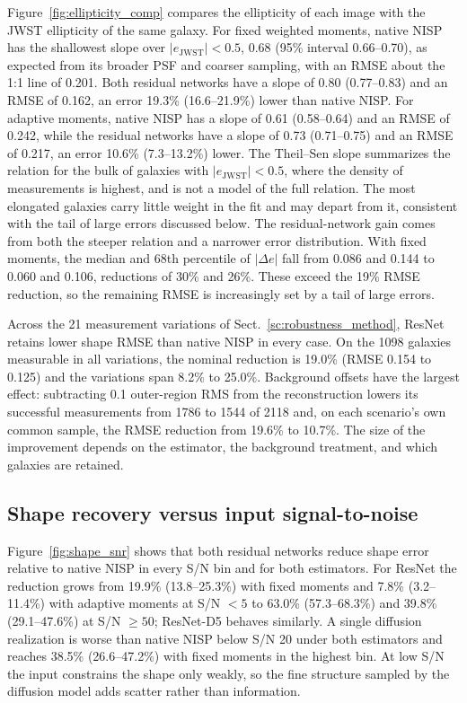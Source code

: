 \documentclass[longauth]{aa}
\begin{document}
Figure~\ref{fig:ellipticity_comp} compares the ellipticity of each image with the JWST ellipticity of the same galaxy.
For fixed weighted moments, native NISP has the shallowest slope over $|e_{\mathrm{JWST}}|<0.5$, 0.68 (95\% interval 0.66--0.70), as expected from its broader PSF and coarser sampling, with an RMSE about the 1:1 line of 0.201.
Both residual networks have a slope of 0.80 (0.77--0.83) and an RMSE of 0.162, an error 19.3\% (16.6--21.9\%) lower than native NISP.
For adaptive moments, native NISP has a slope of 0.61 (0.58--0.64) and an RMSE of 0.242, while the residual networks have a slope of 0.73 (0.71--0.75) and an RMSE of 0.217, an error 10.6\% (7.3--13.2\%) lower.
The Theil--Sen slope summarizes the relation for the bulk of galaxies with $|e_{\mathrm{JWST}}|<0.5$, where the density of measurements is highest, and is not a model of the full relation.
The most elongated galaxies carry little weight in the fit and may depart from it, consistent with the tail of large errors discussed below.
The residual-network gain comes from both the steeper relation and a narrower error distribution.
With fixed moments, the median and 68th percentile of $|\Delta e|$ fall from 0.086 and 0.144 to 0.060 and 0.106, reductions of 30\% and 26\%.
These exceed the 19\% RMSE reduction, so the remaining RMSE is increasingly set by a tail of large errors.

Across the 21 measurement variations of Sect.~\ref{sc:robustness_method}, ResNet retains lower shape RMSE than native NISP in every case.
On the 1098 galaxies measurable in all variations, the nominal reduction is 19.0\% (RMSE 0.154 to 0.125) and the variations span 8.2\% to 25.0\%.
Background offsets have the largest effect: subtracting 0.1 outer-region RMS from the reconstruction lowers its successful measurements from 1786 to 1544 of 2118 and, on each scenario's own common sample, the RMSE reduction from 19.6\% to 10.7\%.
The size of the improvement depends on the estimator, the background treatment, and which galaxies are retained.

\subsection{Shape recovery versus input signal-to-noise}
\label{sc:shape_snr}

Figure~\ref{fig:shape_snr} shows that both residual networks reduce shape error relative to native NISP in every S/N bin and for both estimators.
For ResNet the reduction grows from 19.9\% (13.8--25.3\%) with fixed moments and 7.8\% (3.2--11.4\%) with adaptive moments at S/N $<5$ to 63.0\% (57.3--68.3\%) and 39.8\% (29.1--47.6\%) at S/N $\geq50$; ResNet-D5 behaves similarly.
A single diffusion realization is worse than native NISP below S/N 20 under both estimators and reaches 38.5\% (26.6--47.2\%) with fixed moments in the highest bin.
At low S/N the input constrains the shape only weakly, so the fine structure sampled by the diffusion model adds scatter rather than information.
\end{document}
